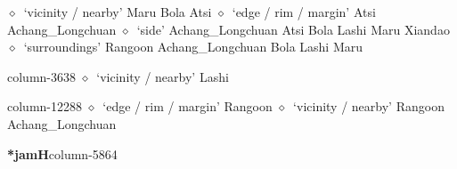          $\diamond$~`vicinity / nearby'
         Maru 
\hspace{1ex}
         Bola 
\hspace{1ex}
         Atsi 
\hspace{1ex}
         $\diamond$~`edge / rim / margin'
         Atsi 
\hspace{1ex}
         Achang\_Longchuan 
\hspace{1ex}
         $\diamond$~`side'
         Achang\_Longchuan 
\hspace{1ex}
         Atsi 
\hspace{1ex}
         Bola 
\hspace{1ex}
         Lashi 
\hspace{1ex}
         Maru 
\hspace{1ex}
         Xiandao 
\hspace{1ex}
         $\diamond$~`surroundings'
         Rangoon 
\hspace{1ex}
         Achang\_Longchuan 
\hspace{1ex}
         Bola 
\hspace{1ex}
         Lashi 
\hspace{1ex}
         Maru 
  \item {\footnotesize \textbf{}}{\tiny column-3638}
         $\diamond$~`vicinity / nearby'
         Lashi 
  \item {\footnotesize \textbf{}}{\tiny column-12288}
         $\diamond$~`edge / rim / margin'
         Rangoon 
\hspace{1ex}
         $\diamond$~`vicinity / nearby'
         Rangoon 
\hspace{1ex}
         Achang\_Longchuan 
  \item {\footnotesize \textbf{*jamH}}{\tiny column-5864}
